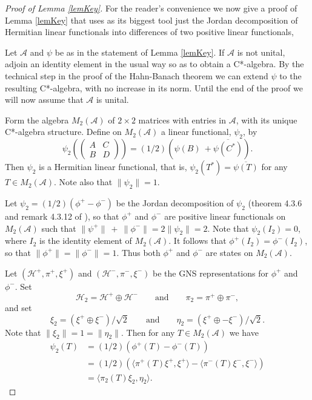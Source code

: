 \documentclass[12pt]{amsart}
\newcommand{\<}{\langle}
\renewcommand{\>}{\rangle}
\newcommand{\cA}{{\mathcal A}}
\newcommand{\cH}{{\mathcal H}}
\theoremstyle{definition}   %
\begin{document}
\begin{proof}[Proof of Lemma \ref{lemKey}]
For the reader's convenience we now give a proof 
of Lemma \ref{lemKey} that uses as its biggest tool just the Jordan 
decomposition of Hermitian linear functionals into differences of 
two positive linear functionals, 

Let $\cA$ and $\psi$ be as in the statement of Lemma \ref{lemKey}.
If $\cA$ is not unital, adjoin an identity element in the usual way so
as to obtain a C*-algebra. By the technical step in the proof of the
Hahn-Banach theorem we can extend $\psi$ to the resulting C*-algebra,
with no increase in its norm. Until the end of the proof we will now assume
that $\cA$ is unital.

Form the algebra $M_2(\cA)$ of $2 \times 2$ matrices with entries in $\cA$,
with its unique C*-algebra structure. Define on $M_2(\cA)$ a linear functional,
$\psi_2$, by
\[
\psi_2\left( \begin{pmatrix}  A & C \\
                                          B & D       \end{pmatrix}    
                  \right) 
= (1/2)(\psi(B) \ + \overline{ \psi (C^*)})              .         
\]
Then $\psi_2$ is a Hermitian linear functional, that is, 
$\psi_2(T^*) = \overline{\psi(T)}$
for any $T \in M_2(\cA)$. Note also that $\|\psi_2\| = 1$.

Let $\psi_2 = (1/2)(\phi^+ - \phi^-)$ be the Jordan decomposition
of $\psi_2$
(theorem 4.3.6 and remark 4.3.12 of \cite{KR1}), so that $\phi^+$
and $\phi^-$ are 
positive linear functionals on $M_2(\cA)$ such that 
$\|\psi^+\| \ + \ \|\phi^-\| = 2 \|\psi_2\| = 2$. Note that $\psi_2(I_2) = 0$,
where $I_2$ is the identity element of $M_2(\cA)$. It follows
that $\phi^+(I_2) = \phi^-(I_2)$, so that $\|\phi^+\| = \|\phi^-\| = 1$.
Thus both $\phi^+$ and $\phi^-$ are states on $M_2(\cA)$.

Let $(\cH^+, \pi^+, \xi^+)$ and $(\cH^-, \pi^-, \xi^-)$ be the GNS 
representations for $\phi^+$ and $\phi^-$. Set
\[
\cH_2 = \cH^+ \oplus \cH^-  \quad \quad \mathrm{and} \quad \quad \pi_2 
= \pi^+ \oplus \pi^-  ,
\]
and set
\[
\xi_2 = (\xi^+ \oplus \xi^-)/\sqrt 2 \quad \quad \mathrm{and} \quad \quad
\eta_2 = (\xi^+ \oplus -\xi^-)/\sqrt 2.
\]
Note that $\|\xi_2\| = 1 = \|\eta_2\|$. Then for any $T \in M_2(\cA)$ we
have
\begin{align*} 
\psi_2(T) &= (1/2)(\phi^+(T) - \phi^-(T))  \\
&= (1/2)(\<\pi^+(T)\xi^+, \xi^+\> - \<\pi^-(T)\xi^-, \xi^-\>)  \\
&= \<\pi_2(T)\xi_2, \eta_2\>  .
\end{align*} 


\end{proof}
\end{document}
